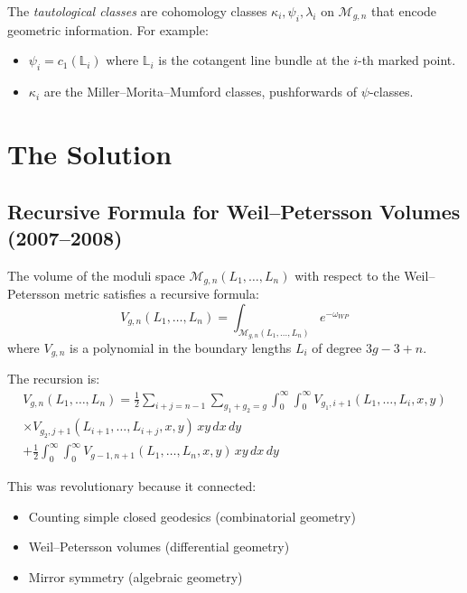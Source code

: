 The \emph{tautological classes} are cohomology classes $\kappa_i, \psi_i, \lambda_i$ on $\mathcal{M}_{g,n}$ that encode geometric information. For example:
\begin{itemize}
\item $\psi_i = c_1(\mathbb{L}_i)$ where $\mathbb{L}_i$ is the cotangent line bundle at the $i$-th marked point.
\item $\kappa_i$ are the Miller--Morita--Mumford classes, pushforwards of $\psi$-classes.
\end{itemize}

\section{The Solution}

\subsection{Recursive Formula for Weil--Petersson Volumes (2007--2008)}

\begin{theorem}
The volume of the moduli space $\mathcal{M}_{g,n}(L_1, \ldots, L_n)$ with respect to the Weil--Petersson metric satisfies a recursive formula:
\begin{equation}
V_{g,n}(L_1, \ldots, L_n) = \int_{\mathcal{M}_{g,n}(L_1, \ldots, L_n)} e^{-\omega_{WP}}
\end{equation}
where $V_{g,n}$ is a polynomial in the boundary lengths $L_i$ of degree $3g-3+n$.
\end{theorem}

The recursion is:
\begin{multline}
V_{g,n}(L_1, \ldots, L_n) = \frac{1}{2} \sum_{i+j = n-1} \sum_{g_1+g_2 = g} \int_0^\infty \int_0^\infty V_{g_1,i+1}(L_1, \ldots, L_i, x, y) \\
\times V_{g_2,j+1}(L_{i+1}, \ldots, L_{i+j}, x, y) \, x y \, dx \, dy \\
+ \frac{1}{2} \int_0^\infty \int_0^\infty V_{g-1,n+1}(L_1, \ldots, L_n, x, y) \, x y \, dx \, dy
\end{multline}

This was revolutionary because it connected:
\begin{itemize}
\item Counting simple closed geodesics (combinatorial geometry)
\item Weil--Petersson volumes (differential geometry)
\item Mirror symmetry (algebraic geometry)
\end{itemize}

